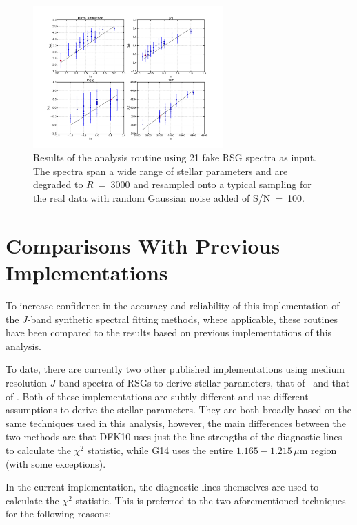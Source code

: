 \begin{figure}
 \centering
 \includegraphics[width=0.65\textwidth]{JAnal/lineonly-test2v22}
 \caption[Test ]{
Results of the analysis routine using 21 fake RSG spectra as input.
The spectra span a wide range of stellar parameters and are degraded to $R~=~3000$ and resampled onto a typical sampling for the real data with random Gaussian noise added of S/N~=~100.
\label{fig:test2}
         }
\end{figure}

\section{Comparisons With Previous Implementations} %
\label{sub:compare}
To increase confidence in the accuracy and reliability of this implementation of the $J$-band synthetic spectral fitting methods,
where applicable, these routines have been compared to the results based on previous implementations of this analysis.

To date, there are currently two other published implementations using medium resolution $J$-band spectra of RSGs to derive stellar parameters,
that of~\cite[][DFK10]{2010MNRAS.407.1203D} and that of
\cite[][G14]{2014PhDT.........G}.
Both of these implementations are subtly different and use different assumptions to derive the stellar parameters.
They are both broadly based on the same techniques used in this analysis,
however, the main differences between the two methods are that DFK10 uses just the line strengths of the diagnostic lines to calculate the $\chi^{2}$ statistic,
while G14 uses the entire $1.165-1.215\,\mu$m region (with some exceptions).

In the current implementation, the diagnostic lines themselves are used to calculate the $\chi^{2}$ statistic.
This is preferred to the two aforementioned techniques for the following reasons:

